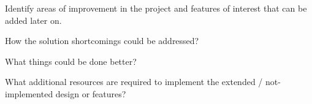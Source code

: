\documentclass[../main.tex]{subfiles}
\begin{document}
\begin{newrequirements}
    \begin{todolist}
    \item Identify areas of improvement in the 
        project and features of interest that 
        can be added later on. 

    \item How the solution shortcomings could be 
        addressed? 

    \item What things could be done better? 

    \item What additional resources are required 
        to implement the extended / not-
        implemented design or features?

    \end{todolist}
\end{newrequirements}

\lipsum[1]
\end{document}
